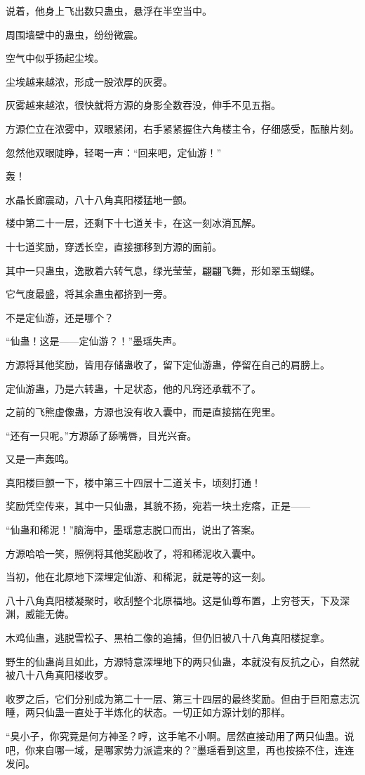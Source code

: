 \begin{this_body}
说着，他身上飞出数只蛊虫，悬浮在半空当中。

周围墙壁中的蛊虫，纷纷微震。

空气中似乎扬起尘埃。

尘埃越来越浓，形成一股浓厚的灰雾。

灰雾越来越浓，很快就将方源的身影全数吞没，伸手不见五指。

方源伫立在浓雾中，双眼紧闭，右手紧紧握住六角楼主令，仔细感受，酝酿片刻。

忽然他双眼陡睁，轻喝一声：“回来吧，定仙游！”

轰！

水晶长廊震动，八十八角真阳楼猛地一颤。

楼中第二十一层，还剩下十七道关卡，在这一刻冰消瓦解。

十七道奖励，穿透长空，直接挪移到方源的面前。

其中一只蛊虫，逸散着六转气息，绿光莹莹，翩翩飞舞，形如翠玉蝴蝶。

它气度最盛，将其余蛊虫都挤到一旁。

不是定仙游，还是哪个？

“仙蛊！这是——定仙游？！”墨瑶失声。

方源将其他奖励，皆用存储蛊收了，留下定仙游蛊，停留在自己的肩膀上。

定仙游蛊，乃是六转蛊，十足状态，他的凡窍还承载不了。

之前的飞熊虚像蛊，方源也没有收入囊中，而是直接揣在兜里。

“还有一只呢。”方源舔了舔嘴唇，目光兴奋。

又是一声轰鸣。

真阳楼巨颤一下，楼中第三十四层十二道关卡，顷刻打通！

奖励凭空传来，其中一只仙蛊，其貌不扬，宛若一块土疙瘩，正是——

“仙蛊和稀泥！”脑海中，墨瑶意志脱口而出，说出了答案。

方源哈哈一笑，照例将其他奖励收了，将和稀泥收入囊中。

当初，他在北原地下深埋定仙游、和稀泥，就是等的这一刻。

八十八角真阳楼凝聚时，收刮整个北原福地。这是仙尊布置，上穷苍天，下及深渊，威能无俦。

木鸡仙蛊，逃脱雪松子、黑柏二像的追捕，但仍旧被八十八角真阳楼捉拿。

野生的仙蛊尚且如此，方源特意深埋地下的两只仙蛊，本就没有反抗之心，自然就被八十八角真阳楼收罗。

收罗之后，它们分别成为第二十一层、第三十四层的最终奖励。但由于巨阳意志沉睡，两只仙蛊一直处于半炼化的状态。一切正如方源计划的那样。

“臭小子，你究竟是何方神圣？哼，这手笔不小啊。居然直接动用了两只仙蛊。说吧，你来自哪一域，是哪家势力派遣来的？”墨瑶看到这里，再也按捺不住，连连发问。

\end{this_body}

